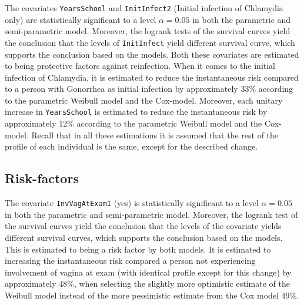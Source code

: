 \documentclass[
]{article}
\begin{document}
The covariates \texttt{YearsSchool} and \texttt{InitInfect2} (Initial infection of Chlamydia only) are statistically significant to a level \(\alpha = 0.05\) in both the parametric and semi-parametric model. Moreover, the logrank tests of the survival curves yield the conclusion that the levels of \texttt{InitInfect} yield different survival curve, which supports the conclusion based on the models. Both these covariates are estimated to being protective factors against reinfection. When it comes to the initial infection of Chlamydia, it is estimated to reduce the instantaneous risk compared to a person with Gonorrhea as initial infection by approximately 33\% according to the parametric Weibull model and the Cox-model. Moreover, each unitary increase in \texttt{YearsSchool} is estimated to reduce the instantaneous risk by approximately 12\% according to the parametric Weibull model and the Cox-model. Recall that in all these estimations it is assumed that the rest of the profile of each individual is the same, except for the described change.

\hypertarget{risk-factors}{%
\subsection{Risk-factors}\label{risk-factors}}

The covariate \texttt{InvVagAtExam1} (yes) is statistically significant to a level \(\alpha = 0.05\) in both the parametric and semi-parametric model. Moreover, the logrank test of the survival curves yield the conclusion that the levels of the covariate yields different survival curves, which supports the conclusion based on the models. This is estimated to being a risk factor by both models. It is estimated to increasing the instantaneous risk compared a person not experiencing involvement of vagina at exam (with identical profile except for this change) by approximately 48\%, when selecting the slightly more optimistic estimate of the Weibull model instead of the more pessimistic estimate from the Cox model 49\%.
\end{document}
